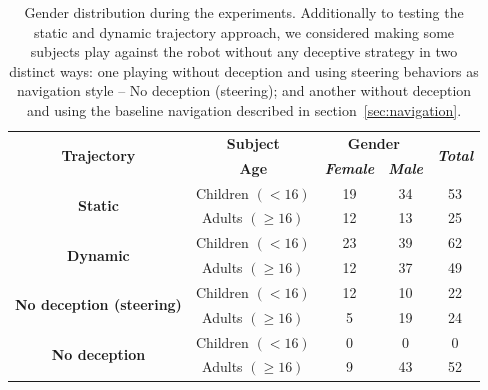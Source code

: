 \begin{table}[htbp]
    \caption{Gender distribution during the experiments. Additionally to testing the static and dynamic trajectory approach, we considered making some subjects play against the robot without any deceptive strategy in two distinct ways: one playing without deception and using steering behaviors as navigation style -- No deception (steering); and another without deception and using the baseline navigation described in section~\ref{sec:navigation}.}
    \begin{center}
        \begin{tabular}{|c|c|c|c|c|}
            \hline
            \multirow{ 2}{*}{\textbf{Trajectory}} & \textbf{Subject}&\multicolumn{2}{|c|}{\textbf{Gender}} & \multirow{ 2}{*}{\textbf{\textit{Total}}} \\
            \cline{3-4}
             & \textbf{Age} & \textbf{\textit{Female}}& \textbf{\textit{Male}} &  \\
            \hline
            \multirow{ 2}{*}{\textbf{Static}} & Children $(<16)$ & 19 & 34 & 53 \\\cline{2-5}
            & Adults $(\geq 16)$ & 12 & 13 & 25 \\
            \hline
            \hline
            \multirow{ 2}{*}{\textbf{Dynamic}} & Children $(<16)$ & 23 & 39 & 62 \\\cline{2-5}
            & Adults $(\geq 16)$ & 12 & 37 & 49 \\
            \hline
            \hline
            \multirow{ 2}{*}{\textbf{No deception (steering)}} & Children $(<16)$ & 12 & 10 & 22 \\\cline{2-5}
            & Adults $(\geq 16)$ & 5 & 19 & 24 \\
            \hline
            \multirow{ 2}{*}{\textbf{No deception}} & Children $(<16)$ & 0 & 0 & 0 \\\cline{2-5}
            & Adults $(\geq 16)$ & 9 & 43 & 52 \\
            \hline
        \end{tabular}
        \label{table::subjectDistribution}
    \end{center}
\end{table}

